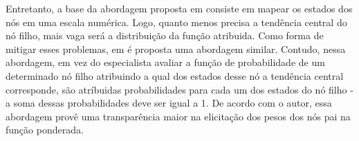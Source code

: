 Entretanto, a base da abordagem proposta em \cite{fenton} consiste em mapear os estados dos nós em uma escala numérica. Logo, quanto menos precisa a tendência central do nó filho, mais vaga será a distribuição da função atribuida. Como forma de mitigar esses problemas, em \cite{laitila} é proposta uma abordagem similar. Contudo, nessa abordagem, em vez do especialista avaliar a função de probabilidade de um determinado nó filho atribuindo a qual dos estados desse nó a tendência central corresponde, são atríbuidas probabilidades para cada um dos estados do nó filho - a soma dessas probabilidades deve ser igual a 1. De acordo com o autor, essa abordagem provê uma transparência maior na elicitação dos pesos dos nós pai na função ponderada.